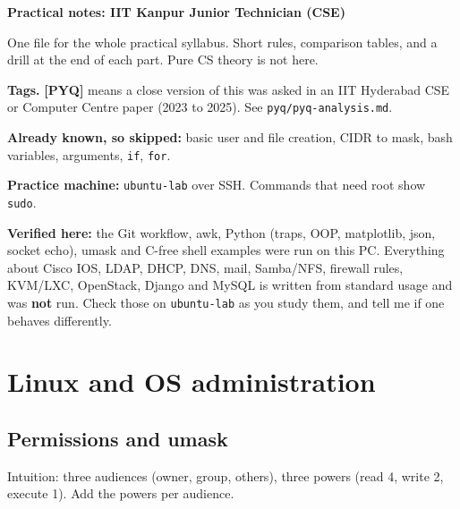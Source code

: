 \documentclass[11pt,a4paper]{article}
\newcommand{\pyq}{\textcolor{ember}{\scriptsize\textbf{[PYQ]}}}
\begin{document}
\begin{center}
{\LARGE\bfseries\color{slate}Practical notes: IIT Kanpur Junior Technician (CSE)}
\end{center}
\tableofcontents
One file for the whole practical syllabus. Short rules, comparison tables, and a drill at the end of each part. Pure CS theory is not here.

\textbf{Tags.} \pyq{} means a close version of this was asked in an IIT Hyderabad CSE or Computer Centre paper (2023 to 2025). See \texttt{pyq/pyq-analysis.md}.

\textbf{Already known, so skipped:} basic user and file creation, CIDR to mask, bash variables, arguments, \texttt{if}, \texttt{for}.

\textbf{Practice machine:} \texttt{ubuntu-lab} over SSH. Commands that need root show \texttt{sudo}.

\textbf{Verified here:} the Git workflow, awk, Python (traps, OOP, matplotlib, json, socket echo), umask and C-free shell examples were run on this PC. Everything about Cisco IOS, LDAP, DHCP, DNS, mail, Samba/NFS, firewall rules, KVM/LXC, OpenStack, Django and MySQL is written from standard usage and was \textbf{not} run. Check those on \texttt{ubuntu-lab} as you study them, and tell me if one behaves differently.

\clearpage
\section{Linux and OS administration}
\subsection{Permissions and umask}
Intuition: three audiences (owner, group, others), three powers (read 4, write 2, execute 1). Add the powers per audience.
\end{document}
